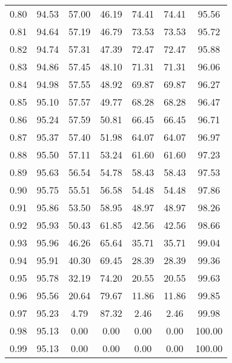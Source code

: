 \begin{tabular}{|c|c|c|c|c|c|c|}
      0.80 &     94.53 &     57.00 &      46.19 &   74.41 &      74.41 &         95.56 \\
      0.81 &     94.64 &     57.19 &      46.79 &   73.53 &      73.53 &         95.72 \\
      0.82 &     94.74 &     57.31 &      47.39 &   72.47 &      72.47 &         95.88 \\
      0.83 &     94.86 &     57.45 &      48.10 &   71.31 &      71.31 &         96.06 \\
      0.84 &     94.98 &     57.55 &      48.92 &   69.87 &      69.87 &         96.27 \\
      0.85 &     95.10 &     57.57 &      49.77 &   68.28 &      68.28 &         96.47 \\
      0.86 &     95.24 &     57.59 &      50.81 &   66.45 &      66.45 &         96.71 \\
      0.87 &     95.37 &     57.40 &      51.98 &   64.07 &      64.07 &         96.97 \\
      0.88 &     95.50 &     57.11 &      53.24 &   61.60 &      61.60 &         97.23 \\
      0.89 &     95.63 &     56.54 &      54.78 &   58.43 &      58.43 &         97.53 \\
      0.90 &     95.75 &     55.51 &      56.58 &   54.48 &      54.48 &         97.86 \\
      0.91 &     95.86 &     53.50 &      58.95 &   48.97 &      48.97 &         98.26 \\
      0.92 &     95.93 &     50.43 &      61.85 &   42.56 &      42.56 &         98.66 \\
      0.93 &     95.96 &     46.26 &      65.64 &   35.71 &      35.71 &         99.04 \\
      0.94 &     95.91 &     40.30 &      69.45 &   28.39 &      28.39 &         99.36 \\
      0.95 &     95.78 &     32.19 &      74.20 &   20.55 &      20.55 &         99.63 \\
      0.96 &     95.56 &     20.64 &      79.67 &   11.86 &      11.86 &         99.85 \\
      0.97 &     95.23 &      4.79 &      87.32 &    2.46 &       2.46 &         99.98 \\
      0.98 &     95.13 &      0.00 &       0.00 &    0.00 &       0.00 &        100.00 \\
      0.99 &     95.13 &      0.00 &       0.00 &    0.00 &       0.00 &        100.00 \\
\bottomrule
\end{tabular}
